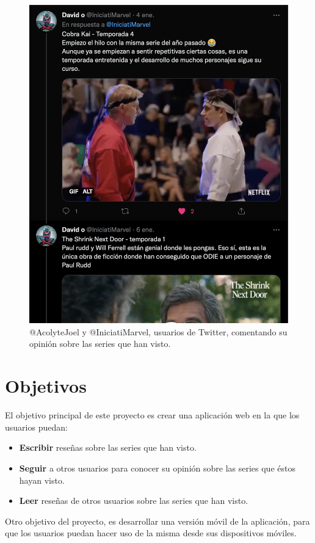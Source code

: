 \begin{figure}[H]
    \includegraphics[scale=0.253]{img/twitter-thread-2.png}
	\caption{ @AcolyteJoel y @IniciatiMarvel, usuarios de Twitter, comentando su opinión sobre las series que han visto. }
    \label{fig:twitter_threads}
\end{figure}

\section{Objetivos}
El objetivo principal de este proyecto es crear una aplicación web en la que los usuarios puedan:
\begin{itemize}
    \item \textbf{Escribir} reseñas sobre las series que han visto.
    \item \textbf{Seguir} a otros usuarios para conocer su opinión sobre las series que éstos hayan visto.
    \item \textbf{Leer} reseñas de otros usuarios sobre las series que han visto.
\end{itemize}

Otro objetivo del proyecto, es desarrollar una versión móvil de la aplicación, para que los usuarios puedan hacer uso de la misma desde sus dispositivos móviles.
